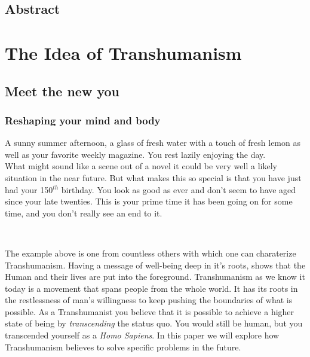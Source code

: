 \documentclass[
			12pt,
			a4paper,
			cleardoublepage=empty,
			final,
			twoside
				]{scrbook}
\begin{document}
\section{Abstract}

\begin{par}
	
	
	
\end{par}

\newpage


\tableofcontents

\cleardoubleemptypage

\listoffigures


\cleardoubleemptypage

\mainmatter
\chapter{The Idea of Transhumanism}
  \section{Meet the new you}
    \subsection{Reshaping your mind and body}
      \begin{par}
	      A sunny summer afternoon, a glass of fresh water with a touch of fresh lemon as well as your favorite weekly magazine. You rest lazily enjoying the day.\\
	      What might sound like a scene out of a novel it could be very well a likely situation in the near future. 
	      But what makes this so special is that you have just had your 150$^{th}$ birthday. 
	      You look as good as ever and don't seem to have aged since your late twenties. 
	      This is your prime time it has been going on for some time, and you don't really see an end to it.
      \end{par}
      \\
      \begin{par}
	      The example above is one from countless others with which one can charaterize Transhumanism.
	      Having a message of well-being deep in it's roots, shows that the Human and their lives are put into the foreground.
	      Transhumanism as we know it today is a movement that spans people from the whole world.
	      It has its roots in the restlessness of man's willingness to keep pushing the boundaries of what is possible.\cite{bostromhistory}
	      As a Transhumanist you believe that it is possible to achieve a higher state of being by \emph{transcending} the status quo. 
	      You would still be human, but you transcended yourself as a \emph{Homo Sapiens}.
	      In this paper we will explore how Transhumanism believes to solve specific problems in the future.
      \end{par}
\end{document}
